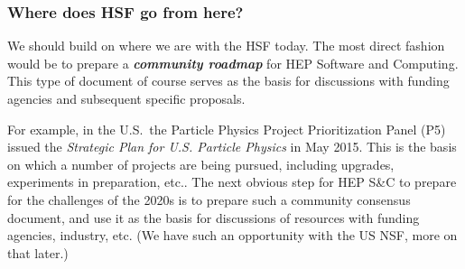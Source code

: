 \begin{frame}
\frametitle{Where does HSF go from here?}

We should build on where we are with the HSF today.
The most direct fashion would be to prepare a {\bf\em community roadmap} for HEP Software and Computing. This type of document of course serves as the basis for discussions with funding agencies and subsequent specific proposals.
\vskip 0.15in

For example, in the U.S.\ the Particle Physics Project Prioritization Panel 
(P5) issued the {\em Strategic Plan for U.S. Particle Physics} in May 2015. This is the basis on which a number of projects are being pursued, including upgrades, experiments in preparation, etc..
\vskip 0.15in
The next obvious step for HEP S\&C to prepare for the challenges of the 2020s is to prepare such a community consensus document, and use it as the basis for discussions of resources with funding agencies, industry, etc. (We have such an 
opportunity with the US NSF, more on that later.)

\end{frame}


